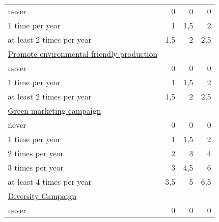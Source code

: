 \begin{table}[]
\begin{tabular}{|l|r|r|r|}
never                                           & 0                                   & 0                          & 0                      \\
1 time per year                                 & 1                                   & 1,5                        & 2                      \\
at least 2 times per year                       & 1,5                                 & 2                          & 2,5                    \\
\underline{Promote environmental friendly production} &                                     &                            &                        \\
never                                           & 0                                   & 0                          & 0                      \\
1 time per year                                 & 1                                   & 1,5                        & 2                      \\
at least 2 times per year                       & 1,5                                 & 2                          & 2,5                    \\
\underline{Green marketing campaign}                  &                                     &                            &                        \\
never                                           & 0                                   & 0                          & 0                      \\
1 time per year                                 & 1                                   & 1,5                        & 2                      \\
2 times per year                                & 2                                   & 3                          & 4                      \\
3 times per year                                & 3                                   & 4,5                        & 6                      \\
at least 4 times per year                       & 3,5                                 & 5                          & 6,5                    \\
\underline{Diversity Campaign}                        &                                     &                            &                        \\
never                                           & 0                                   & 0                          & 0                      \\

\end{tabular}
\end{table}
